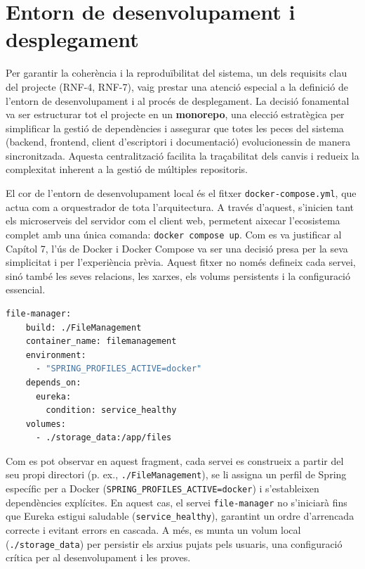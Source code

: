 \section{Entorn de desenvolupament i desplegament}

Per garantir la coherència i la reproduïbilitat del sistema, un dels requisits clau del projecte (RNF-4, RNF-7), vaig prestar una atenció especial a la definició de l'entorn de desenvolupament i al procés de desplegament. La decisió fonamental va ser estructurar tot el projecte en un \textbf{monorepo}, una elecció estratègica per simplificar la gestió de dependències i assegurar que totes les peces del sistema (backend, frontend, client d'escriptori i documentació) evolucionessin de manera sincronitzada. Aquesta centralització facilita la traçabilitat dels canvis i redueix la complexitat inherent a la gestió de múltiples repositoris.

El cor de l'entorn de desenvolupament local és el fitxer \texttt{docker-compose.yml}, que actua com a orquestrador de tota l'arquitectura. A través d'aquest, s'inicien tant els microserveis del servidor com el client web, permetent aixecar l'ecosistema complet amb una única comanda: \texttt{docker compose up}. Com es va justificar al Capítol 7, l'ús de Docker i Docker Compose va ser una decisió presa per la seva simplicitat i per l'experiència prèvia. Aquest fitxer no només defineix cada servei, sinó també les seves relacions, les xarxes, els volums persistents i la configuració essencial.

\begin{lstlisting}[language=bash, caption={Fragment del fitxer `compose.yml` definint un servei}]
  file-manager:
    build: ./FileManagement
    container_name: filemanagement
    environment:
      - "SPRING_PROFILES_ACTIVE=docker"
    depends_on:
      eureka:
        condition: service_healthy
    volumes:
      - ./storage_data:/app/files
\end{lstlisting}

Com es pot observar en aquest fragment, cada servei es construeix a partir del seu propi directori (p. ex., \texttt{./FileManagement}), se li assigna un perfil de Spring específic per a Docker (\texttt{SPRING\_PROFILES\_ACTIVE=docker}) i s'estableixen dependències explícites. En aquest cas, el servei \texttt{file-manager} no s'iniciarà fins que Eureka estigui saludable (\texttt{service\_healthy}), garantint un ordre d'arrencada correcte i evitant errors en cascada. A més, es munta un volum local (\texttt{./storage\_data}) per persistir els arxius pujats pels usuaris, una configuració crítica per al desenvolupament i les proves.

